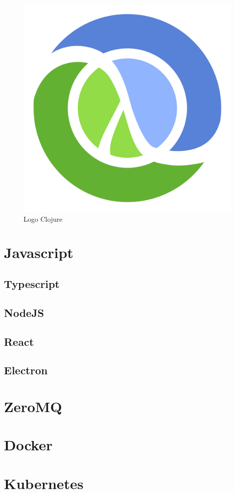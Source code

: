 	\begin{figure}
	    \centering
	    \includegraphics[scale=0.1]{pictures/clojure_logo.png}
	    \caption{Logo Clojure}
	    \label{fig:logo_clojure}
	\end{figure}
	
	\section{Javascript}
    	\subsection{Typescript}
    	\subsection{NodeJS}
    	\subsection{React}
    	\subsection{Electron}
	\section{ZeroMQ}
	\section{Docker}
	\section{Kubernetes}
	